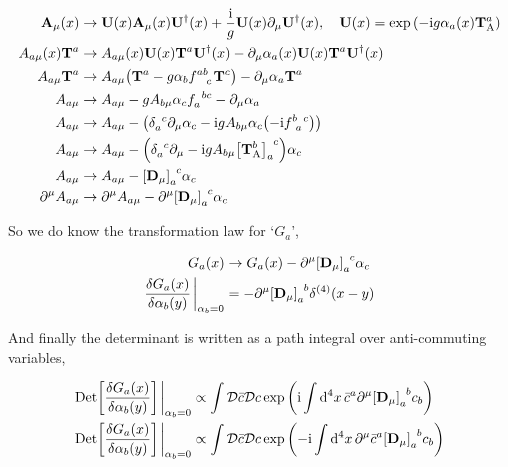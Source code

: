\begin{align}
    \vb A_\mu\qty(x)&\rightarrow \vb U\qty(x)\vb A_\mu\qty(x)\vb U^\dagger\qty(x)+\frac\im g \vb U\qty(x)\partial_\mu\vb U^\dagger\qty(x),\ \ \ \vb U\qty(x)=\exp\qty(-\im g\alpha_a\qty(x)\vb T^a_{\textnormal{A}})\nonumber\\
    A_{a\mu}\qty(x)\vb T^a&\rightarrow A_{a\mu}\qty(x)\vb U\qty(x)\vb T^a\vb U^\dagger\qty(x)-\partial_\mu\alpha_a\qty(x) \vb U\qty(x)\vb T^a\vb U^\dagger\qty(x)\nonumber\\
    A_{a\mu}\vb T^a&\rightarrow A_{a\mu}\qty(\vb T^a- g\alpha_b\tensor{f}{^a^b_c}\vb T^c)-\partial_\mu\alpha_a \vb T^a\nonumber\\
    A_{a\mu}&\rightarrow A_{a\mu}- gA_{b\mu}\alpha_c\tensor{f}{_a^b^c}-\partial_\mu\alpha_a\nonumber\\
    A_{a\mu}&\rightarrow A_{a\mu}-\qty(\tensor{\delta}{_a^c}\partial_\mu\alpha_c -\im g A_{b\mu}\alpha_c\qty(-\im\tensor{f}{^b_a^c}))\nonumber\\
    A_{a\mu}&\rightarrow A_{a\mu}-\qty(\tensor{\delta}{_a^c}\partial_\mu -\im g A_{b\mu}\tensor{\qty[\vb T^b_{\textnormal A}]}{_a^c})\alpha_c\nonumber\\
    A_{a\mu}&\rightarrow A_{a\mu}-\tensor{\qty[\vb D_\mu]}{_a^c}\alpha_c\nonumber\\
    \partial^\mu A_{a\mu}&\rightarrow \partial^\mu A_{a\mu}-\partial^\mu\tensor{\qty[\vb D_\mu]}{_a^c}\alpha_c\nonumber
\end{align}

So we do know the transformation law for `$G_a$',

\begin{align}
    G_a\qty(x)&\rightarrow G_a\qty(x)-\partial^\mu\tensor{\qty[\vb D_\mu]}{_a^c}\alpha_c\nonumber\\
    \fdv{G_a\qty(x)}{\alpha_b\qty(y)}\eval_{\alpha_b=0}&=-\partial^\mu\tensor{\qty[\vb D_\mu]}{_a^b}\delta^{\qty(4)}\qty(x-y)\nonumber
\end{align}

And finally the determinant is written as a path integral over anti-commuting variables,

\begin{align}
    \Det\qty[\fdv{G_a\qty(x)}{\alpha_b\qty(y)}]\eval_{\alpha_b=0}&\propto\int\Dd{\bar c}\Dd{c}\exp\qty(\im\int\dd[4]{x}\bar c^a\partial^\mu\tensor{\qty[\vb D_\mu]}{_a^b}c_b)\nonumber\\
    \Det\qty[\fdv{G_a\qty(x)}{\alpha_b\qty(y)}]\eval_{\alpha_b=0}&\propto\int\Dd{\bar c}\Dd{c}\exp\qty(-\im\int\dd[4]{x}\partial^\mu\bar c^a\tensor{\qty[\vb D_\mu]}{_a^b}c_b)\nonumber
\end{align}

